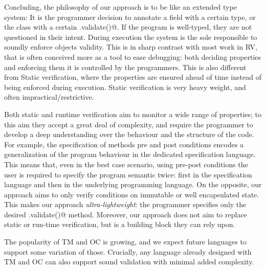 
\loseSpace
\noindent Concluding, 
the philosophy of our approach is to be like an extended type system: 
It is the programmer decision
to annotate a field with a certain type,
or the class with a certain \Q@.validate()@.
If the program is well-typed, they are not questioned in their intent.
During execution the system is the sole responsible to soundly enforce objects validity.
This is in sharp contrast with most work in RV, that is often conceived more as a tool to ease debugging:
both deciding properties and enforcing them it is controlled by the programmers.
This is also different from Static verification,
where the properties are ensured ahead of time instead of being enforced during execution.
Static verification is very heavy weight, and often impractical/restrictive.

Both static and runtime verification
aim to monitor a wide range of properties; to this aim they accept a 
great deal of complexity, and require the programmer to develop a deep understanding
over the behaviour and the structure of the code.
For example, the specification of methods pre and post conditions
encodes a generalization of the program behaviour in the dedicated specification language.
This means that, even in the best case scenario, 
using pre-post conditions the user is required to specify the program semantic twice:
first in the specification language and then in the underlying programming language.
On the opposite, our approach aims to only verify conditions on immutable or well encapsulated state.
This makes our approach \emph{ultra-lightweight}:
the programmer specifies only the desired \Q@.validate()@ method.
Moreover, our approach does not aim to replace static or run-time verification,
but is a building block they can rely upon.

The popularity of TM and OC is growing, and we expect future languages to support some variation of those.
Crucially, any language already designed with TM and OC
can also support sound validation with minimal added complexity.